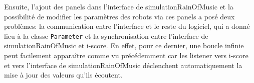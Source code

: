 Ensuite, l'ajout des panels dans l'interface de simulationRainOfMusic et la possibilité de modifier les paramètres des robots via ces panels a posé deux problèmes: la communication entre l'interface et le reste du logiciel, qui a donné lieu à la classe \verb|Parameter| et la synchronisation entre l'interface de simulationRainOfMusic et i-score. En effet, pour ce dernier, une boucle infinie peut facilement apparaître comme vu précédemment car les listener vers i-score et vers l'interface de simulationRainOfMusic déclenchent automatiquement la mise à jour des valeurs qu'ils écoutent. 

